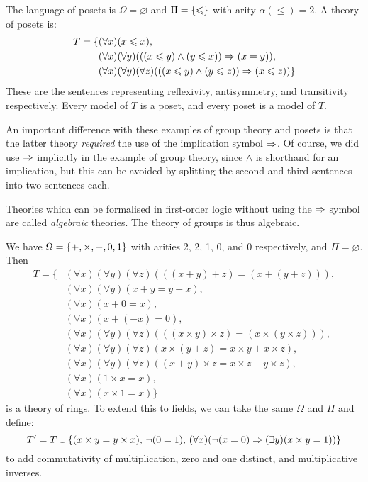\documentclass{article}
\begin{document}
\begin{example}[Posets]
    The language of posets is $\Omega = \varnothing$ and $\Pi = \left\lbrace \leqslant \right\rbrace$ with arity $\alpha(\leq) = 2$. A theory of posets is:
    \begin{align*}
    	T = \{ &(\forall x)(x \leqslant x), \\
    	&(\forall x)(\forall y)(((x \leqslant y) \land (y \leqslant x)) \Rightarrow (x = y)), \\
    	&(\forall x)(\forall y)(\forall z)(((x \leqslant y) \land (y \leqslant z)) \Rightarrow (x \leqslant z)) \}
	\end{align*}
	These are the sentences representing reflexivity, antisymmetry, and transitivity respectively. Every model of $T$ is a poset, and every poset is a model of $T$.
\end{example}

An important difference with these examples of group theory and posets is that the latter theory \textit{required} the use of the implication symbol $\Rightarrow$. Of course, we did use $\Rightarrow$ implicitly in the example of group theory, since $\land$ is shorthand for an implication, but this can be avoided by splitting the second and third sentences into two sentences each.

\begin{note}
	Theories which can be formalised in first-order logic without using the $\Rightarrow$ symbol are called \textit{algebraic} theories. The theory of groups is thus algebraic.
\end{note}

\begin{example}
	\label{rings-and-fields-example}
    We have $\Omega = \left\lbrace +, \times, -, 0, 1 \right\rbrace$ with arities 2, 2, 1, 0, and 0 respectively, and $\Pi = \varnothing$. Then
    \begin{align*}
    	T = \{ &(\forall x)(\forall y)(\forall z)(((x+y)+z) = (x+(y+z))), \\
    	&(\forall x)(\forall y)(x+y = y+x), \\
    	&(\forall x)(x + 0 = x), \\
    	&(\forall x)(x + (-x) = 0), \\
    	&(\forall x)(\forall y)(\forall z)(((x \times y) \times z) = (x \times (y \times z))), \\
    	&(\forall x)(\forall y)(\forall z)(x \times (y + z) = x \times y + x \times z), \\
    	&(\forall x)(\forall y)(\forall z)((x + y) \times z = x \times z + y \times z), \\
    	&(\forall x)(1 \times x = x), \\
    	&(\forall x)(x \times 1 = x) \}
	\end{align*}
	is a theory of rings. To extend this to fields, we can take the same $\Omega$ and $\Pi$ and define:
	\[
	T' = T \cup \left\lbrace (x \times y = y \times x), \, \lnot (0 = 1), \,
	(\forall x)(\lnot (x = 0) \Rightarrow (\exists y)(x \times y = 1)) \right\rbrace
	\]
	to add commutativity of multiplication, zero and one distinct, and multiplicative inverses.
\end{example}
\end{document}
